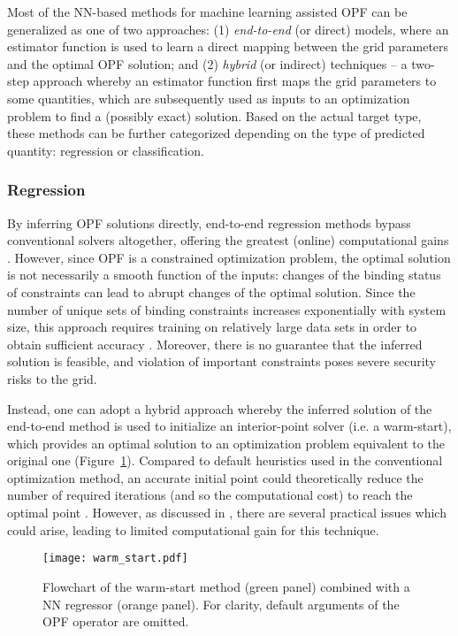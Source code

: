 \documentclass[journal]{IEEEtran}
\begin{document}
Most of the NN-based methods for machine learning assisted OPF can be generalized as one of two approaches: (1) \textit{end-to-end} (or direct) models, where an estimator function is used to learn a direct mapping between the grid parameters and the optimal OPF solution; and (2) \textit{hybrid} (or indirect) techniques -- a two-step approach whereby an estimator function first maps the grid parameters to some quantities, which are subsequently used as inputs to an optimization problem to find a (possibly exact) solution. Based on the actual target type, these methods can be further categorized depending on the type of predicted quantity: regression or classification. 

\subsubsection{Regression}
By inferring OPF solutions directly, end-to-end regression methods bypass conventional solvers altogether, offering the greatest (online) computational gains \cite{Guha2019}. However, since OPF is a constrained optimization problem, the optimal solution is not necessarily a smooth function of the inputs: changes of the binding status of constraints can lead to abrupt changes of the optimal solution. Since the number of unique sets of binding constraints increases exponentially with system size, this approach requires training on relatively large data sets in order to obtain sufficient accuracy \cite{Fioretto2019}. Moreover, there is no guarantee that the inferred solution is feasible, and violation of important constraints poses severe security risks to the grid.

Instead, one can adopt a hybrid approach whereby the inferred solution of the end-to-end method is used to initialize an interior-point solver (i.e. a warm-start), which provides an optimal solution to an optimization problem equivalent to the original one (Figure~\ref{fig:warm_start}). Compared to default heuristics used in the conventional optimization method, an accurate initial point could theoretically reduce the number of required iterations (and so the computational cost) to reach the optimal point \cite{Baker2019}. However, as discussed in \cite{Robson2020}, there are several practical issues which could arise, leading to limited computational gain for this technique. 

\begin{figure}[!ht]
    \centerline{\texttt{[image: warm\_start.pdf]}}
    \caption{Flowchart of the warm-start method (green panel) combined with a NN regressor (orange panel). For clarity, default arguments of the OPF operator are omitted.}
    \label{fig:warm_start}
\end{figure}
\end{document}
